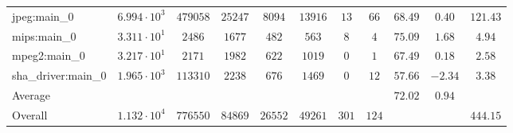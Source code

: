 \begin{tabular}{|l|c|c|c|c|c|c|c|c|c|c|}
jpeg:main\_0            & $ 6.994 \cdot 10^{3} $ & $ 479058 $ & $ 25247 $ & $ 8094  $ & $ 13916 $ & $ 13  $ & $ 66  $ & $ 68.49       $ & $ 0.40    $ & $ 121.43  $ \\
mips:main\_0            & $ 3.311 \cdot 10^{1} $ & $ 2486   $ & $ 1677  $ & $ 482   $ & $ 563   $ & $ 8   $ & $ 4   $ & $ 75.09       $ & $ 1.68    $ & $ 4.94    $ \\
mpeg2:main\_0           & $ 3.217 \cdot 10^{1} $ & $ 2171   $ & $ 1982  $ & $ 622   $ & $ 1019  $ & $ 0   $ & $ 1   $ & $ 67.49       $ & $ 0.18    $ & $ 2.58    $ \\
sha\_driver:main\_0     & $ 1.965 \cdot 10^{3} $ & $ 113310 $ & $ 2238  $ & $ 676   $ & $ 1469  $ & $ 0   $ & $ 12  $ & $ 57.66       $ & $ -2.34   $ & $ 3.38    $ \\
\hline
Average                 & $                    $ & $        $ & $       $ & $       $ & $       $ & $     $ & $     $ & $ 72.02       $ & $ 0.94    $ & $         $ \\
\hline
Overall                 & $ 1.132 \cdot 10^{4} $ & $ 776550 $ & $ 84869 $ & $ 26552 $ & $ 49261 $ & $ 301 $ & $ 124 $ & $             $ & $         $ & $ 444.15  $ \\
\hline
\end{tabular}
